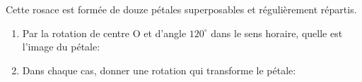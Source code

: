 \documentclass[exercice]{thedocument}%
\begin{document}
%
\begin{minipage}[c]{.35\linewidth}
    \begin{center}
    \end{center}
\end{minipage}\hspace{0.05\linewidth}
\begin{minipage}[c]{.55\linewidth}
    \begin{flushleft}
        Cette rosace est formée de douze pétales superposables et régulièrement
        répartis.
    \end{flushleft}
    \begin{enumerate}
        \item Par la rotation de centre O et d'angle $120^\circ$ dans le sens
        horaire, quelle est l'image du pétale:
        \begin{enumerate}
        \end{enumerate}
        \item Dans chaque cas, donner une rotation qui transforme le pétale:
        \begin{enumerate}
        \end{enumerate}
    \end{enumerate}
\end{minipage}
\end{document}
